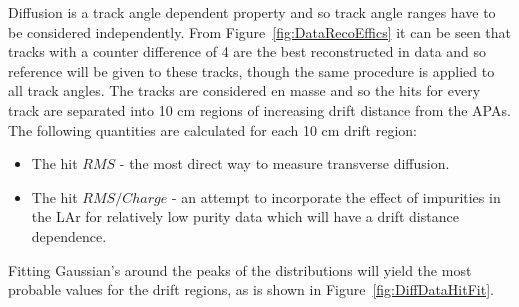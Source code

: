 Diffusion is a track angle dependent property and so track angle ranges have to be considered independently. From Figure~\ref{fig:DataRecoEffics} it can be seen that tracks with a counter difference of 4 are the best reconstructed in data and so reference will be given to these tracks, though the same procedure is applied to all track angles. The tracks are considered en masse and so the hits for every track are separated into 10 cm regions of increasing drift distance from the APAs. The following quantities are calculated for each 10 cm drift region:
\begin{itemize}
\item The hit $RMS$ - the most direct way to measure transverse diffusion.
\item The hit $RMS/Charge$ - an attempt to incorporate the effect of impurities in the LAr for relatively low purity data which will have a drift distance dependence.
\end{itemize}
Fitting Gaussian's around the peaks of the distributions will yield the most probable values for the drift regions, as is shown in Figure~\ref{fig:DiffDataHitFit}. \\

